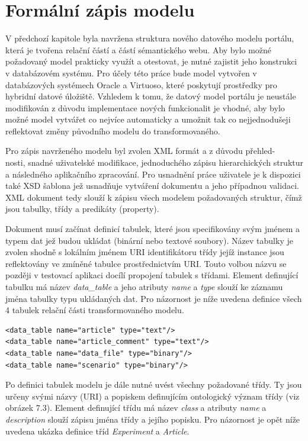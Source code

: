 \documentclass{projekt}
\begin{document}
\section{Formální zápis modelu}
\hspace{0.65cm}V předchozí kapitole byla navržena struktura nového datového modelu portálu, která je tvořena relační částí a částí sémantického webu. Aby bylo možné požadovaný model prakticky využít a otestovat, je nutné zajistit jeho konstrukci v databázovém systému. Pro účely této práce bude model vytvořen v databázových systémech Oracle a Virtuoso, které poskytují prostředky pro hybridní datové úložiště. Vzhledem k tomu, že datový model portálu je neustále modifikován z důvodu implementace nových funkcionalit je vhodné, aby bylo možné model vytvářet co nejvíce automaticky a umožnit tak co nejjednodušeji reflektovat změny původního modelu do transformovaného.

Pro zápis navrženého modelu byl zvolen XML formát a z důvodu přehled-\\nosti, snadné uživatelské modifikace, jednoduchého zápisu hierarchických struktur a následného aplikačního zpracování. Pro usnadnění práce uživatele je k dispozici také XSD šablona jež usnadňuje vytváření dokumentu a jeho případnou validaci. XML dokument tedy slouží k zápisu všech modelem požadovaných struktur, čímž jsou tabulky, třídy a predikáty (property).

Dokument musí začínat definicí tabulek, které jsou specifikovány svým jménem a typem dat jež budou ukládat (binární nebo textové soubory). Název tabulky je zvolen shodně s lokálním jménem URI identifikátoru třídy jejíž instance jsou reflektovány ve zmíněné tabulce prostřednictvím URI. Touto volbou názvu se později v testovací aplikaci docílí propojení tabulek s třídami. Element definující tabulku má název {\it data\_table} a jeho atributy {\it name} a {\it type} slouží ke záznamu jména tabulky typu ukládaných dat. Pro názornost je níže uvedena definice všech 4 tabulek relační části transformovaného modelu.

\begin{verbatim}
<data_table name="article" type="text"/>
<data_table name="article_comment" type="text"/>
<data_table name="data_file" type="binary"/>
<data_table name="scenario" type="binary"/>
\end{verbatim}

Po definici tabulek modelu je dále nutné uvést všechny požadované třídy. Ty jsou určeny svými názvy (URI) a popiskem definujícím ontologický význam třídy (viz obrázek 7.3).
Element definující třídu má název {\it class} a atributy {\it name} a {\it description} slouží zápisu jména třídy a jejího popisku. Pro názornost je opět níže uvedena ukázka definice tříd {\it Experiment} a {\it Article}.
\end{document}
